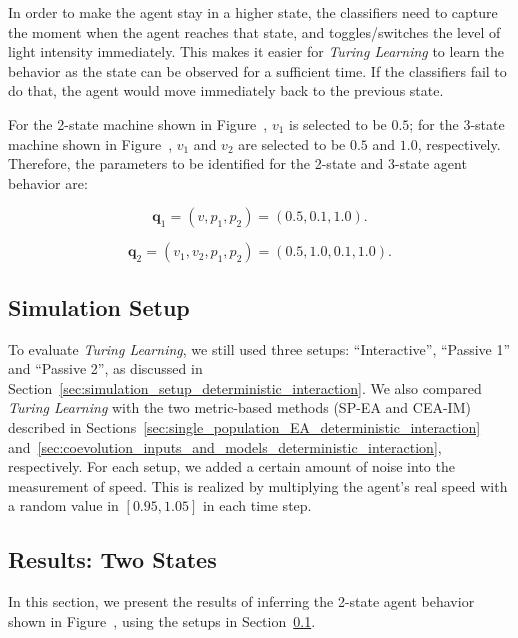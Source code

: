 In order to make the agent stay in a higher state, the classifiers need to capture the moment when the agent reaches that state, and toggles/switches the level of light intensity immediately. This makes it easier for \textit{Turing Learning} to learn the behavior as the state can be observed for a sufficient time. If the classifiers fail to do that, the agent would move immediately back to the previous state. 

For the 2-state machine shown in Figure~, $v_1$ is selected to be $0.5$; for the 3-state machine shown in Figure~, $v_1$ and $v_2$ are selected to be $0.5$ and $1.0$, respectively. Therefore, the parameters to be identified for the 2-state and 3-state agent behavior are:

\begin{equation}\label{eq:parameters_2_states}
\mathbf{q}_1 = (v, p_1, p_2) = (0.5, 0.1, 1.0).
\end{equation}

\begin{equation}\label{eq:parameters_3_states}
\mathbf{q}_2 = (v_1, v_2, p_1, p_2) = (0.5, 1.0, 0.1, 1.0).
\end{equation}

\subsection{Simulation Setup}\label{sec:simulation_setup_stochastic_interaction}

To evaluate \textit{Turing Learning}, we still used three setups: ``Interactive'', ``Passive 1'' and ``Passive 2'', as discussed in Section~\ref{sec:simulation_setup_deterministic_interaction}. We also compared \textit{Turing Learning} with the two metric-based methods (SP-EA and CEA-IM) described in Sections~\ref{sec:single_population_EA_deterministic_interaction} and~\ref{sec:coevolution_inputs_and_models_deterministic_interaction}, respectively. For each setup, we added a certain amount of noise into the measurement of speed. This is realized by multiplying the agent's real speed with a random value in $[0.95, 1.05]$ in each time step. 

\subsection{Results: Two States}\label{sec:results_interaction_stochastic_2states}

In this section, we present the results of inferring the 2-state agent behavior shown in Figure~, using the setups in Section~\ref{sec:simulation_setup_stochastic_interaction}. 

